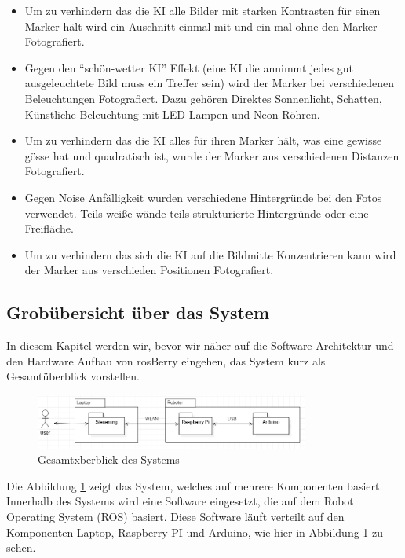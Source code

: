 \documentclass[conference]{IEEEtran}
\begin{document}
	\begin{itemize}
		\item Um zu verhindern das die KI alle Bilder mit starken Kontrasten für einen Marker hält wird ein Auschnitt einmal mit und ein mal ohne den Marker Fotografiert.
		\item Gegen den  "`schön-wetter KI"' Effekt (eine KI die annimmt jedes gut ausgeleuchtete Bild muss ein Treffer sein) wird der Marker bei verschiedenen Beleuchtungen Fotografiert. Dazu gehören Direktes Sonnenlicht, Schatten, Künstliche Beleuchtung mit LED Lampen und Neon Röhren. 
		\item Um zu verhindern das die KI alles für ihren Marker hält, was eine gewisse gösse hat und quadratisch ist, wurde der Marker aus verschiedenen Distanzen Fotografiert. 
		\item Gegen Noise Anfälligkeit wurden verschiedene Hintergründe bei den Fotos verwendet. Teils weiße wände teils strukturierte Hintergründe oder eine Freifläche. 
		\item Um zu verhindern das sich die KI auf die Bildmitte Konzentrieren kann wird der Marker aus verschieden Positionen Fotografiert. 
	\end{itemize}
	
	\subsection{Grobübersicht über das System}
	In diesem Kapitel werden wir, bevor wir näher auf die Software Architektur und den Hardware Aufbau von rosBerry eingehen, das System kurz als Gesamtüberblick vorstellen.
	
	\begin{figure}[!ht]
		\centering
		\includegraphics[width=9cm]{img/Gesamtsystem.PNG}
		\caption{Gesamtxberblick des Systems}
		\label{Gesamt zusammenhang}
	\end{figure}
	Die Abbildung \ref{Gesamt zusammenhang} zeigt das System, welches auf mehrere Komponenten basiert. Innerhalb des Systems wird eine Software eingesetzt, die auf dem Robot Operating System (ROS) basiert. Diese Software läuft verteilt auf den Komponenten Laptop, Raspberry PI und Arduino, wie hier in Abbildung \ref{Gesamt zusammenhang} zu sehen. \\
	
\end{document}
